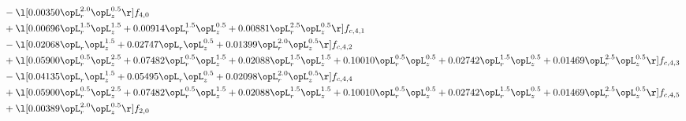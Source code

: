 \begin{alignat}{2}
& - \l[  0.00350 \opL_r^{2.0} \opL_z^{0.5}  \r] f_{4,0} \nonumber \\ 
& + \l[  0.00696 \opL_r^{1.5} \opL_z^{1.5} +  0.00914 \opL_r^{1.5} \opL_z^{0.5} +  0.00881 \opL_r^{2.5} \opL_z^{0.5}  \r] f_{c,4,1} \nonumber \\ 
& - \l[  0.02068 \opL_r \opL_z^{1.5} +  0.02747 \opL_r \opL_z^{0.5} +  0.01399 \opL_r^{2.0} \opL_z^{0.5}  \r] f_{c,4,2} \nonumber \\ 
& + \l[  0.05900 \opL_r^{0.5} \opL_z^{2.5} +  0.07482 \opL_r^{0.5} \opL_z^{1.5} +  0.02088 \opL_r^{1.5} \opL_z^{1.5} +  0.10010 \opL_r^{0.5} \opL_z^{0.5} +  0.02742 \opL_r^{1.5} \opL_z^{0.5} +  0.01469 \opL_r^{2.5} \opL_z^{0.5}  \r] f_{c,4,3} \nonumber \\ 
& - \l[  0.04135 \opL_r \opL_z^{1.5} +  0.05495 \opL_r \opL_z^{0.5} +  0.02098 \opL_r^{2.0} \opL_z^{0.5}  \r] f_{c,4,4} \nonumber \\ 
& + \l[  0.05900 \opL_r^{0.5} \opL_z^{2.5} +  0.07482 \opL_r^{0.5} \opL_z^{1.5} +  0.02088 \opL_r^{1.5} \opL_z^{1.5} +  0.10010 \opL_r^{0.5} \opL_z^{0.5} +  0.02742 \opL_r^{1.5} \opL_z^{0.5} +  0.01469 \opL_r^{2.5} \opL_z^{0.5}  \r] f_{c,4,5} \nonumber \\ 
& + \l[  0.00389 \opL_r^{2.0} \opL_z^{0.5}  \r] f_{2,0} \nonumber \\ 
\end{alignat} 


